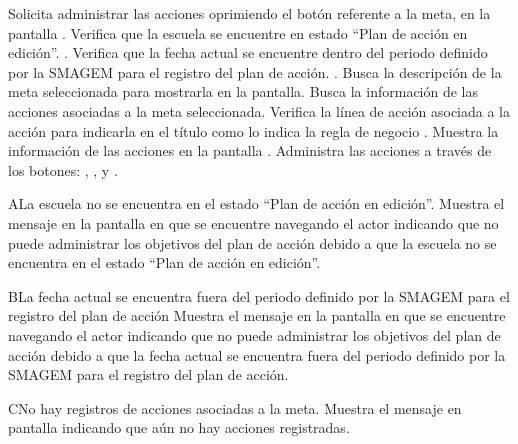  \begin{UCtrayectoria}
    \UCpaso[\UCactor] Solicita administrar las acciones oprimiendo el botón \botAdm referente a la meta, en la pantalla . %
	\UCpaso[\UCsist] Verifica que la escuela se encuentre en  estado ``Plan de acción en edición''. .
    \UCpaso[\UCsist] Verifica que la fecha actual se encuentre dentro del periodo definido por la SMAGEM para el registro del plan de acción. .    
    \UCpaso[\UCsist] Busca la descripción de la meta seleccionada para mostrarla en la pantalla.
    \UCpaso[\UCsist] Busca la información de las acciones asociadas a la meta seleccionada. 
    \UCpaso[\UCsist] Verifica la línea de acción asociada a la acción para indicarla en el título como lo indica la regla de negocio .
    \UCpaso[\UCsist] Muestra la información de las acciones en la pantalla . 
    \UCpaso[\UCactor] Administra las acciones a través de los botones: , \botAdm, \botEdit y \botKo. \label{cup7:Mostrar}
 \end{UCtrayectoria}

\begin{UCtrayectoriaA}{A}{La escuela no se encuentra en el estado ``Plan de acción en edición''.}
    \UCpaso[\UCsist] Muestra el mensaje  en la pantalla en que se encuentre navegando el actor indicando que no puede administrar los objetivos del plan de acción debido a que la escuela no se encuentra en el estado ``Plan de acción en edición''. 
 \end{UCtrayectoriaA}
 
   \begin{UCtrayectoriaA}{B}{La fecha actual se encuentra fuera del periodo definido por la SMAGEM para el registro del plan de acción}
    \UCpaso[\UCsist] Muestra el mensaje  en la pantalla en que se encuentre navegando el actor indicando que no puede administrar los objetivos del plan de acción debido a que la fecha actual se encuentra fuera del periodo definido por la SMAGEM para el registro del plan de acción.
 \end{UCtrayectoriaA} 


\begin{UCtrayectoriaA}{C}{No hay registros de acciones asociadas a la meta.}
    \UCpaso[\UCsist] Muestra el mensaje  en pantalla  
    indicando que aún no hay acciones registradas.
 \end{UCtrayectoriaA}
 

